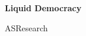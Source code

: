 \documentclass[12pt]{article}
\begin{document}
	\pagestyle{empty}

	\begin{center}
		\vspace*{1.5cm}
		\vspace{0.5cm}
		\textbf{\huge{Liquid Democracy}}

		\vspace{0.5cm}
		ASResearch
		\textbf{}
	\end{center}






\end{document}
